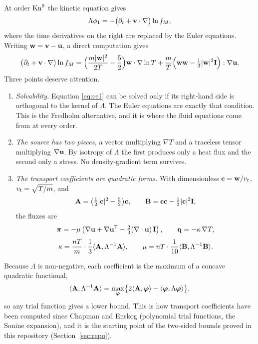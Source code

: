 At order $\mathrm{Kn}^0$ the kinetic equation gives
\begin{equation}
  \Lambda\phi_1 = -\bigl(\partial_t+\mathbf{v}\cdot\nabla\bigr)\ln f_M ,
  \label{eq:ce1}
\end{equation}
where the time derivatives on the right are replaced by the Euler
equations. Writing $\mathbf{w}=\mathbf{v}-\mathbf{u}$, a direct computation gives
\begin{equation}
  \bigl(\partial_t+\mathbf{v}\cdot\nabla\bigr)\ln f_M
  = \Bigl(\frac{m|\mathbf{w}|^2}{2T}-\frac52\Bigr)\mathbf{w}\cdot\nabla\ln T
  + \frac{m}{T}\Bigl(\mathbf{w}\mathbf{w}-\tfrac13|\mathbf{w}|^2\mathbf I\Bigr):\nabla\mathbf{u} .
  \label{eq:ce-source}
\end{equation}
Three points deserve attention.
\begin{enumerate}
  \item \emph{Solvability.} Equation \eqref{eq:ce1} can be solved only if
    its right-hand side is orthogonal to the kernel of $\Lambda$. The Euler
    equations are exactly that condition. This is the Fredholm alternative,
    and it is where the fluid equations come from at every order.
  \item \emph{The source has two pieces,} a vector multiplying $\nabla T$
    and a traceless tensor multiplying $\nabla\mathbf{u}$. By isotropy of
    $\Lambda$ the first produces only a heat flux and the second only a
    stress. No density-gradient term survives.
  \item \emph{The transport coefficients are quadratic forms.} With
    dimensionless $\mathbf{c}=\mathbf{w}/v_t$, $v_t=\sqrt{T/m}$, and
    \[
      \mathbf A=\bigl(\tfrac12|\mathbf{c}|^2-\tfrac52\bigr)\mathbf{c},\qquad
      \mathbf B=\mathbf{c}\mathbf{c}-\tfrac13|\mathbf{c}|^2\mathbf I,
    \]
    the fluxes are
    \begin{equation}
      \boldsymbol{\pi} = -\mu\left(\nabla\mathbf{u} + \nabla\mathbf{u}^{\mathsf T}
         - \tfrac{2}{3}(\nabla\cdot\mathbf{u})\,\mathbf{I}\right),
      \qquad
      \mathbf{q} = -\kappa\,\nabla T ,
      \label{eq:NSF}
    \end{equation}
    \begin{equation}
      \kappa = \frac{nT}{m}\cdot\frac13\langle \mathbf A,\Lambda^{-1}\mathbf A \rangle,
      \qquad
      \mu = nT\cdot\frac1{10}\langle \mathbf B,\Lambda^{-1}\mathbf B \rangle .
      \label{eq:transport-forms}
    \end{equation}
\end{enumerate}
Because $\Lambda$ is non-negative, each coefficient is the maximum of a
concave quadratic functional,
\begin{equation}
  \langle \mathbf A,\Lambda^{-1}\mathbf A \rangle
  = \max_{\boldsymbol\varphi}\bigl\{2\langle \mathbf A,\boldsymbol\varphi \rangle
      -\langle \boldsymbol\varphi,\Lambda\boldsymbol\varphi \rangle\bigr\},
  \label{eq:variational}
\end{equation}
so any trial function gives a lower bound. This is how transport
coefficients have been computed since Chapman and Enskog (polynomial trial
functions, the Sonine expansion), and it is the starting point of the
two-sided bounds proved in this repository (Section~\ref{sec:repo}).

